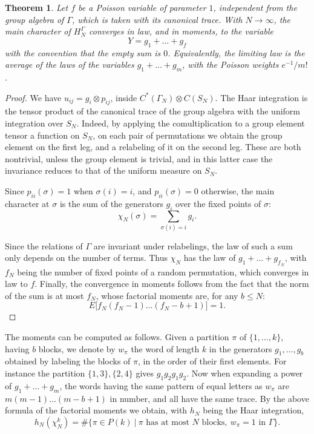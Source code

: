 \documentclass[11pt,a4paper]{article}
\newtheorem{thm}{Theorem}[section]
\begin{document}
\begin{thm}\label{poisson-reflections}
Let $f$ be a Poisson variable of parameter $1$, independent from the group algebra of $\Gamma$, which is taken with its canonical trace. With $N\to\infty$, the main character of $H_N^\Gamma$ converges in law, and in moments, to the variable
\[
 Y=g_1+\ldots+g_f
\]
with the convention that the empty sum is $0$. Equivalently, the limiting law is the average of the laws of the variables $g_1+\ldots+g_m$, with the Poisson weights $e^{-1}/m!$.
\end{thm}

\begin{proof}
We have $u_{ij}=g_i\otimes p_{ij}$, inside $C^*(\Gamma_N)\otimes C(S_N)$. The Haar integration is the tensor product of the canonical trace of the group algebra with the uniform integration over $S_N$. Indeed, by applying the comultiplication to a group element tensor a function on $S_N$, on each pair of permutations we obtain the group element on the first leg, and a relabeling of it on the second leg. These are both nontrivial, unless the group element is trivial, and in this latter case the invariance reduces to that of the uniform measure on $S_N$.

Since $p_{ii}(\sigma)=1$ when $\sigma(i)=i$, and $p_{ii}(\sigma)=0$ otherwise, the main character at $\sigma$ is the sum of the generators $g_i$ over the fixed points of $\sigma$:
\[
 \chi_N(\sigma)=\sum_{\sigma(i)=i}g_i.
\]

Since the relations of $\Gamma$ are invariant under relabelings, the law of such a sum only depends on the number of terms. Thus $\chi_N$ has the law of $g_1+\ldots+g_{f_N}$, with $f_N$ being the number of fixed points of a random permutation, which converges in law to $f$. Finally, the convergence in moments follows from the fact that the norm of the sum is at most $f_N$, whose factorial moments are, for any $b\leq N$:
\[
 E\big[f_N(f_N-1)\ldots(f_N-b+1)\big]=1.
\]
\end{proof}

The moments can be computed as follows. Given a partition $\pi$ of $\{1,\ldots,k\}$, having $b$ blocks, we denote by $w_\pi$ the word of length $k$ in the generators $g_1,\ldots,g_b$ obtained by labeling the blocks of $\pi$, in the order of their first elements. For instance the partition $\{1,3\},\{2,4\}$ gives $g_1g_2g_1g_2$. Now when expanding a power of $g_1+\ldots+g_m$, the words having the same pattern of equal letters as $w_\pi$ are $m(m-1)\ldots(m-b+1)$ in number, and all have the same trace. By the above formula of the factorial moments we obtain, with $h_N$ being the Haar integration,
\[
 h_N(\chi_N^k)=\#\Big\{\pi\in P(k)\ \Big|\ \pi\text{ has at most }N\text{ blocks},\ w_\pi=1\text{ in }\Gamma\Big\}.
\]
\end{document}
